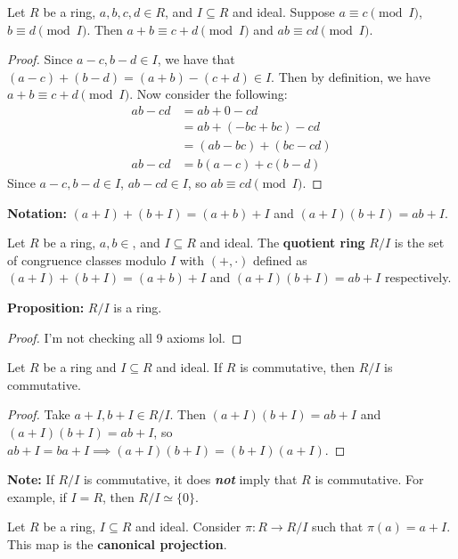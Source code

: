 \documentclass [12pt] {article}
\newenvironment{definition}[1]{\begin{tcolorbox}[title={Definition: #1},colback=blue!5!white,colframe=black!75!blue]}{\end{tcolorbox}}
\newenvironment{theorem}[1]{\begin{tcolorbox}[title={Theorem #1},colback=green!5!white,colframe=black!75!green]}{\end{tcolorbox}}
\renewcommand{\bf}[1]{\textbf{{#1}}}
\newcommand{\ib}[1]{\textit{\textbf{{#1}}}}
\begin{document}
\newpage
\begin{theorem}{}
    Let $R$ be a ring, $a, b, c, d \in R$, and $I \subseteq R$ and ideal. Suppose
    $a \equiv c \pmod{I}$, $b \equiv d \pmod{I}$. Then $a + b \equiv c + d \pmod{I}$ and
    $ab \equiv cd \pmod{I}$.
\end{theorem}
\begin{proof}
    Since $a - c, b - d \in I$, we have that $(a - c) + (b - d) = (a + b) - (c + d) \in I$. Then by
    definition, we have $a + b \equiv c + d \pmod{I}$. Now consider the following:
    \begin{align*}
        ab - cd &= ab + 0 - cd \\
                &= ab + (-bc + bc) - cd \\
                &= (ab - bc) + (bc - cd) \\
        ab - cd &= b(a - c) + c(b - d)
    \end{align*}
    Since $a - c, b - d \in I$, $ab - cd \in I$, so $ab \equiv cd \pmod{I}$.
\end{proof}
\bf{Notation:} $(a + I) + (b + I) = (a + b) + I$ and $(a + I)(b + I) = ab + I$.

\begin{definition}{Quotient Ring}
    Let $R$ be a ring, $a, b \in $, and $I \subseteq R$ and ideal. The \bf{quotient ring} $R/I$ is
    the set of congruence classes modulo $I$ with $(+, \cdot)$ defined as
    $(a + I) + (b + I) = (a + b) + I$ and $(a + I)(b + I) = ab + I$ respectively.
\end{definition}
\bf{Proposition:} $R/I$ is a ring.
\begin{proof}
    I'm not checking all 9 axioms lol.
\end{proof}

\begin{theorem}{}
    Let $R$ be a ring and $I \subseteq R$ and ideal. If $R$ is commutative, then $R/I$ is
    commutative.
\end{theorem}
\begin{proof}
    Take $a + I, b + I \in R/I$. Then $(a + I)(b + I) = ab + I$ and $(a + I)(b + I) = ab + I$, so
    $ab + I = ba + I \implies (a + I)(b + I) = (b + I)(a + I)$.
\end{proof}
\bf{Note:} If $R/I$ is commutative, it does \ib{not} imply that $R$ is commutative. For example, if
$I = R$, then $R/I \simeq \{ 0 \}$.

\begin{definition}{Canonical Projection}
    Let $R$ be a ring, $I \subseteq R$ and ideal. Consider $\pi : R \to R/I$ such that
    $\pi(a) = a + I$. This map is the \bf{canonical projection}.
\end{definition}
\end{document}
